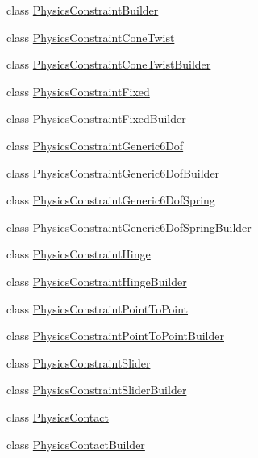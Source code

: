 \begin{DoxyCompactItemize}
\item 
class \mbox{\hyperlink{classnjli_1_1_physics_constraint_builder}{Physics\+Constraint\+Builder}}
\item 
class \mbox{\hyperlink{classnjli_1_1_physics_constraint_cone_twist}{Physics\+Constraint\+Cone\+Twist}}
\item 
class \mbox{\hyperlink{classnjli_1_1_physics_constraint_cone_twist_builder}{Physics\+Constraint\+Cone\+Twist\+Builder}}
\item 
class \mbox{\hyperlink{classnjli_1_1_physics_constraint_fixed}{Physics\+Constraint\+Fixed}}
\item 
class \mbox{\hyperlink{classnjli_1_1_physics_constraint_fixed_builder}{Physics\+Constraint\+Fixed\+Builder}}
\item 
class \mbox{\hyperlink{classnjli_1_1_physics_constraint_generic6_dof}{Physics\+Constraint\+Generic6\+Dof}}
\item 
class \mbox{\hyperlink{classnjli_1_1_physics_constraint_generic6_dof_builder}{Physics\+Constraint\+Generic6\+Dof\+Builder}}
\item 
class \mbox{\hyperlink{classnjli_1_1_physics_constraint_generic6_dof_spring}{Physics\+Constraint\+Generic6\+Dof\+Spring}}
\item 
class \mbox{\hyperlink{classnjli_1_1_physics_constraint_generic6_dof_spring_builder}{Physics\+Constraint\+Generic6\+Dof\+Spring\+Builder}}
\item 
class \mbox{\hyperlink{classnjli_1_1_physics_constraint_hinge}{Physics\+Constraint\+Hinge}}
\item 
class \mbox{\hyperlink{classnjli_1_1_physics_constraint_hinge_builder}{Physics\+Constraint\+Hinge\+Builder}}
\item 
class \mbox{\hyperlink{classnjli_1_1_physics_constraint_point_to_point}{Physics\+Constraint\+Point\+To\+Point}}
\item 
class \mbox{\hyperlink{classnjli_1_1_physics_constraint_point_to_point_builder}{Physics\+Constraint\+Point\+To\+Point\+Builder}}
\item 
class \mbox{\hyperlink{classnjli_1_1_physics_constraint_slider}{Physics\+Constraint\+Slider}}
\item 
class \mbox{\hyperlink{classnjli_1_1_physics_constraint_slider_builder}{Physics\+Constraint\+Slider\+Builder}}
\item 
class \mbox{\hyperlink{classnjli_1_1_physics_contact}{Physics\+Contact}}
\item 
class \mbox{\hyperlink{classnjli_1_1_physics_contact_builder}{Physics\+Contact\+Builder}}

\end{DoxyCompactItemize}
